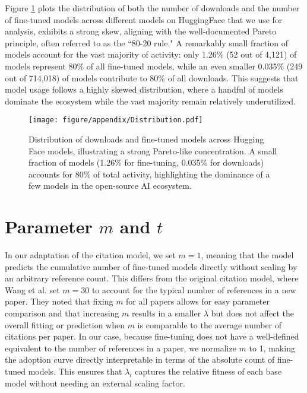 \documentclass{article} %
\begin{document}
Figure \ref{fig:distribution} plots the distribution of both the number of downloads and the number of fine-tuned models across different models on HuggingFace that we use for analysis, exhibits a strong skew, aligning with the well-documented Pareto principle, often referred to as the ``80-20 rule." A remarkably small fraction of models account for the vast majority of activity: only 1.26\% (52 out of 4,121) of models represent 80\% of all fine-tuned models, while an even smaller 0.035\% (249 out of 714,018) of models contribute to 80\% of all downloads. This suggests that model usage follows a highly skewed distribution, where a handful of models dominate the ecosystem while the vast majority remain relatively underutilized. 

 \begin{figure}[ht]
        \begin{center}
            \texttt{[image: figure/appendix/Distribution.pdf]}
        \end{center}
        \caption{Distribution of downloads and fine-tuned models across Hugging Face models, illustrating a strong Pareto-like concentration. A small fraction of models (1.26\% for fine-tuning, 0.035\% for downloads) accounts for 80\% of total activity, highlighting the dominance of a few models in the open-source AI ecosystem.}
        \label{fig:distribution}
    \end{figure}


\section{Parameter $m$ and $t$} \label{sec:parameter_m_t}
In our adaptation of the citation model, we set $ m = 1 $, meaning that the model predicts the cumulative number of fine-tuned models directly without scaling by an arbitrary reference count. This differs from the original citation model, where Wang et al. \cite{wangQuantifyingLongTermScientific2013} set $ m = 30 $ to account for the typical number of references in a new paper. They noted that fixing $ m $ for all papers allows for easy parameter comparison and that increasing $ m $ results in a smaller $\lambda$ but does not affect the overall fitting or prediction when $ m $ is comparable to the average number of citations per paper. In our case, because fine-tuning does not have a well-defined equivalent to the number of references in a paper, we normalize $ m $ to 1, making the adoption curve directly interpretable in terms of the absolute count of fine-tuned models. This ensures that $\lambda_i$ captures the relative fitness of each base model without needing an external scaling factor.
\end{document}
